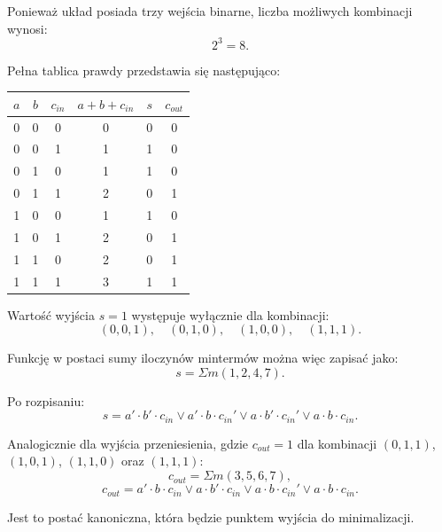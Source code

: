 Ponieważ układ posiada trzy wejścia binarne, liczba możliwych kombinacji wynosi:
\begin{equation*}
2^3 = 8.
\end{equation*}

Pełna tablica prawdy przedstawia się następująco:

\begin{center}
\begin{tabular}{|c|c|c|c|c|c|}
\hline
$a$ & $b$ & $c_{in}$ & $a+b+c_{in}$ & $s$ & $c_{out}$ \\
\hline
0 & 0 & 0 & 0 & 0 & 0 \\
0 & 0 & 1 & 1 & 1 & 0 \\
0 & 1 & 0 & 1 & 1 & 0 \\
0 & 1 & 1 & 2 & 0 & 1 \\
1 & 0 & 0 & 1 & 1 & 0 \\
1 & 0 & 1 & 2 & 0 & 1 \\
1 & 1 & 0 & 2 & 0 & 1 \\
1 & 1 & 1 & 3 & 1 & 1 \\
\hline
\end{tabular}
\end{center}

Wartość wyjścia $s = 1$ występuje wyłącznie dla kombinacji:
\begin{equation*}
(0,0,1), \quad (0,1,0), \quad (1,0,0), \quad (1,1,1).
\end{equation*}

Funkcję w postaci sumy iloczynów mintermów można więc zapisać jako:
\begin{equation*}
s = \Sigma m(1, 2, 4, 7).
\end{equation*}

Po rozpisaniu:
\begin{equation*}
s = a' \cdot b' \cdot c_{in} \vee a' \cdot b \cdot c_{in}' \vee a \cdot b' \cdot c_{in}' \vee a \cdot b \cdot c_{in}.
\end{equation*}

Analogicznie dla wyjścia przeniesienia, gdzie $c_{out} = 1$ dla kombinacji $(0,1,1)$, $(1,0,1)$, $(1,1,0)$ oraz $(1,1,1)$:
\begin{equation*}
c_{out} = \Sigma m(3, 5, 6, 7),
\end{equation*}
\begin{equation*}
c_{out} = a' \cdot b \cdot c_{in} \vee a \cdot b' \cdot c_{in} \vee a \cdot b \cdot c_{in}' \vee a \cdot b \cdot c_{in}.
\end{equation*}

Jest to postać kanoniczna, która będzie punktem wyjścia do minimalizacji.

